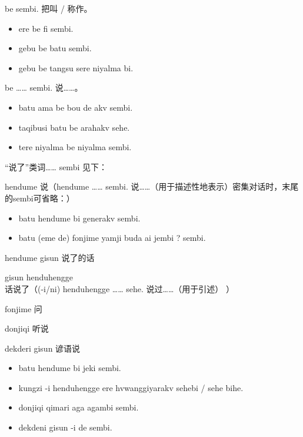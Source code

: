 \begin{des}
    \item[\A be \B sembi.] 把\A 叫 / 称作\B 。
        \begin{itemize}
            \item ere be fi sembi.
            \item gebu be batu sembi.
            \item gebu be tangsu sere niyalma  bi.
        \end{itemize}
    \item[\A \B be …… sembi.] \A 说\B ……。
        \begin{itemize}
            \item batu ama be bou de akv sembi.
            \item taqibusi batu be  arahakv sehe.
            \item {} tere niyalma be niyalma  sembi.
        \end{itemize}
    \item[“说了”类词…… sembi]见下：
        \begin{des}
            \item[hendume] 说（\A hendume …… sembi. \A 说……（用于描述性地表示）密集对话时，末尾的sembi可省略：）
            \begin{itemize}
                \item batu hendume bi generakv sembi.
                \item batu (eme de) fonjime yamji buda ai jembi ? sembi.
            \end{itemize}
            \item[hendume gisun] 说了的话
            \item[gisun henduhengge] 话说了（\A (-i/ni) henduhengge …… sehe. \A 说过……（用于引述） ）
            \item[fonjime] 问
            \item[donjiqi] 听说
            \item[dekderi gisun] 谚语说  
        \end{des}
        \begin{itemize}
            \item batu hendume bi  jeki sembi.
            \item kungzi -i henduhengge ere  hvwanggiyarakv sehebi / sehe bihe.
            \item donjiqi qimari aga agambi sembi.
            \item dekdeni gisun  -i  de     sembi.

\end{itemize}
\end{des}
